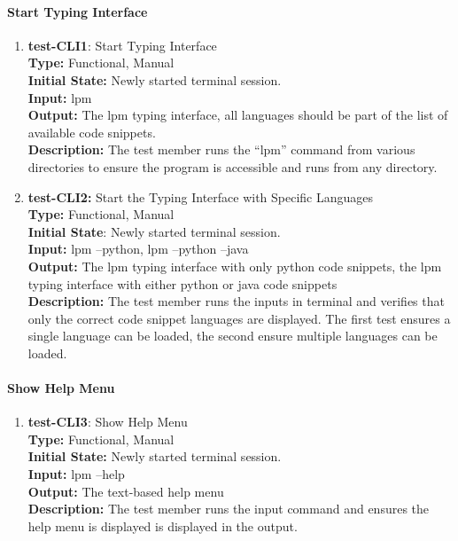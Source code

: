\documentclass[12pt, titlepage]{article}
\begin{document}
\paragraph{Start Typing Interface}
\begin{enumerate}
\item{\textbf{test-CLI1}: Start Typing Interface\\}
\textbf{Type:} Functional, Manual \\
\textbf{Initial State:} Newly started terminal session.\\
\textbf{Input:} lpm\\
\textbf{Output:} The lpm typing interface, all languages should be part of the list of available code snippets.\\
\textbf{Description:} The test member runs the ``lpm'' command from various directories to ensure the program is accessible and runs from any directory.\\

\item{\textbf{test-CLI2:} Start the Typing Interface with Specific Languages\\}
\textbf{Type:} Functional, Manual \\
\textbf{Initial State}: Newly started terminal session.\\
\textbf{Input:} lpm --python, lpm --python --java\\
\textbf{Output:} The lpm typing interface with only python code snippets, the lpm typing interface with either python or java code snippets\\
\textbf{Description:} The test member runs the inputs in terminal and verifies that only the correct code snippet languages are displayed. The first test ensures a single language can be loaded, the second ensure multiple languages can be loaded.\\
\end{enumerate}

\paragraph{Show Help Menu}

\begin{enumerate}
\item{\textbf{test-CLI3}: Show Help Menu\\}
\textbf{Type:} Functional, Manual\\
\textbf{Initial State:} Newly started terminal session. \\
\textbf{Input:} lpm --help \\
\textbf{Output:} The text-based help menu \\
\textbf{Description:} The test member runs the input command and ensures the help menu is displayed is displayed in the output. \\
\end{enumerate}
\end{document}
